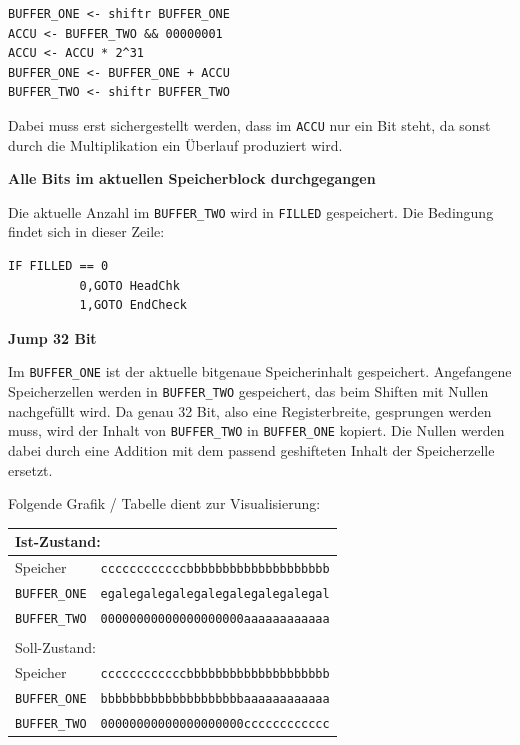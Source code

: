 \begin{verbatim}
BUFFER_ONE <- shiftr BUFFER_ONE
ACCU <- BUFFER_TWO && 00000001
ACCU <- ACCU * 2^31
BUFFER_ONE <- BUFFER_ONE + ACCU
BUFFER_TWO <- shiftr BUFFER_TWO
\end{verbatim}

Dabei muss erst sichergestellt werden, dass im \texttt{ACCU} nur ein Bit steht, da sonst durch die Multiplikation ein Überlauf produziert wird.

\textbf{Alle Bits im aktuellen Speicherblock durchgegangen}

Die aktuelle Anzahl im \texttt{BUFFER\_TWO} wird in \texttt{FILLED} gespeichert. Die Bedingung findet sich in dieser Zeile:

\begin{verbatim}
IF FILLED == 0
          0,GOTO HeadChk
          1,GOTO EndCheck
\end{verbatim}

\textbf{Jump 32 Bit}

Im \texttt{BUFFER\_ONE} ist der aktuelle bitgenaue Speicherinhalt gespeichert. Angefangene Speicherzellen werden in \texttt{BUFFER\_TWO} gespeichert, das beim Shiften mit Nullen nachgefüllt wird. Da genau 32 Bit, also eine Registerbreite, gesprungen werden muss, wird der Inhalt von \texttt{BUFFER\_TWO} in \texttt{BUFFER\_ONE} kopiert. Die Nullen werden dabei durch eine Addition mit dem passend geshifteten Inhalt der Speicherzelle ersetzt.

Folgende Grafik / Tabelle dient zur Visualisierung:

\begin{tabular}{|l|l|}
\multicolumn{2}{l}{Ist-Zustand:}\\
\hline
Speicher   & \texttt{ccccccccccccbbbbbbbbbbbbbbbbbbbb}\\
\hline
\texttt{BUFFER\_ONE} & \texttt{egalegalegalegalegalegalegalegal}\\
\hline
\texttt{BUFFER\_TWO} & \texttt{00000000000000000000aaaaaaaaaaaa}\\
\hline
\multicolumn{2}{l}{}\\
\multicolumn{2}{l}{Soll-Zustand:}\\
\hline
Speicher   & \texttt{ccccccccccccbbbbbbbbbbbbbbbbbbbb}\\
\hline
\texttt{BUFFER\_ONE} & \texttt{bbbbbbbbbbbbbbbbbbbbaaaaaaaaaaaa}\\
\hline
\texttt{BUFFER\_TWO} & \texttt{00000000000000000000cccccccccccc}\\
\hline
\end{tabular}

